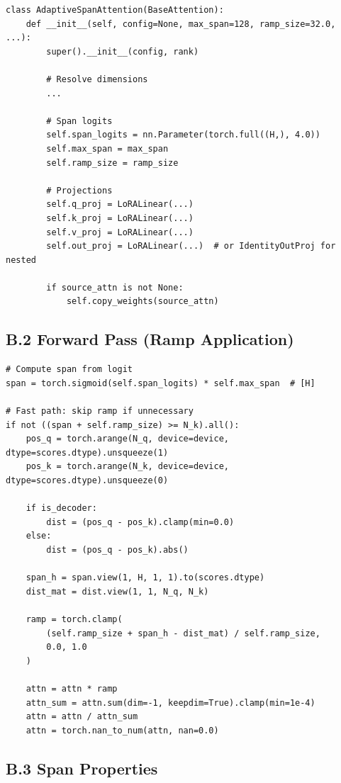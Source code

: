\begin{lstlisting}
class AdaptiveSpanAttention(BaseAttention):
    def __init__(self, config=None, max_span=128, ramp_size=32.0, ...):
        super().__init__(config, rank)
        
        # Resolve dimensions
        ...
        
        # Span logits
        self.span_logits = nn.Parameter(torch.full((H,), 4.0))
        self.max_span = max_span
        self.ramp_size = ramp_size
        
        # Projections
        self.q_proj = LoRALinear(...)
        self.k_proj = LoRALinear(...)
        self.v_proj = LoRALinear(...)
        self.out_proj = LoRALinear(...)  # or IdentityOutProj for nested
        
        if source_attn is not None:
            self.copy_weights(source_attn)
\end{lstlisting}

\subsection{B.2 Forward Pass (Ramp Application)}

\begin{lstlisting}
# Compute span from logit
span = torch.sigmoid(self.span_logits) * self.max_span  # [H]

# Fast path: skip ramp if unnecessary
if not ((span + self.ramp_size) >= N_k).all():
    pos_q = torch.arange(N_q, device=device, dtype=scores.dtype).unsqueeze(1)
    pos_k = torch.arange(N_k, device=device, dtype=scores.dtype).unsqueeze(0)
    
    if is_decoder:
        dist = (pos_q - pos_k).clamp(min=0.0)
    else:
        dist = (pos_q - pos_k).abs()
    
    span_h = span.view(1, H, 1, 1).to(scores.dtype)
    dist_mat = dist.view(1, 1, N_q, N_k)
    
    ramp = torch.clamp(
        (self.ramp_size + span_h - dist_mat) / self.ramp_size,
        0.0, 1.0
    )
    
    attn = attn * ramp
    attn_sum = attn.sum(dim=-1, keepdim=True).clamp(min=1e-4)
    attn = attn / attn_sum
    attn = torch.nan_to_num(attn, nan=0.0)
\end{lstlisting}

\subsection{B.3 Span Properties}

